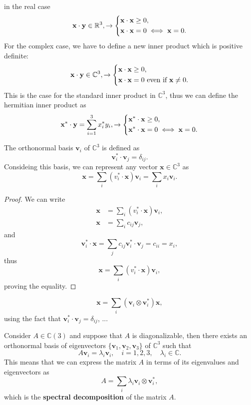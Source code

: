 in the real case
\[
    \mathbf{x} \cdot \mathbf{y} \in \mathbb{R}^3, \to  \begin{dcases}
        \mathbf{x} \cdot \mathbf{x} \geq 0, \\
        \mathbf{x} \cdot \mathbf{x} = 0 \iff \mathbf{x} = 0.
    \end{dcases}
\]
For the complex case, we have to define a new inner product which is positive definite:
\[
    \mathbf{x} \cdot \mathbf{y} \in \mathbb{C}^3, \to  \begin{dcases}
        \mathbf{x} \cdot \mathbf{x} \geq 0, \\
        \mathbf{x} \cdot \mathbf{x} = 0 \text{ even if } \mathbf{x} \neq 0.
    \end{dcases}
\]
This is the case for the standard inner product in \(\mathbb{C}^3\), thus we can define the hermitian inner product as
\[
    \mathbf{x}^* \cdot \mathbf{y} = \sum_{i=1}^3 x_i^* y_i, \to \begin{dcases}
        \mathbf{x}^* \cdot \mathbf{x} \geq 0, \\
        \mathbf{x}^* \cdot \mathbf{x} = 0 \iff \mathbf{x} = 0.
    \end{dcases}
\]

The orthonormal basis \(\mathbf{v}_i\) of \(\mathbb{C}^3\) is defined as
\[
    \mathbf{v}_i^* \cdot \mathbf{v}_j = \delta_{ij}.
\]
Consideing this basis, we can represent any vector \(\mathbf{x} \in \mathbb{C}^3\) as
\[
    \mathbf{x} = \sum_{i} (v_i^* \cdot \mathbf{x}) \mathbf{v}_i = \sum_{i} x_i \mathbf{v}_i.
\]
\begin{proof}
    We can write
    \[
        \begin{aligned}
            \mathbf{x} & = \sum_{i} (v_i^* \cdot \mathbf{x}) \mathbf{v}_i, \\
            \mathbf{x} & = \sum_{i} c_{ij} \mathbf{v}_j,
        \end{aligned}
    \]
    and
    \[
        \mathbf{v}_i^* \cdot \mathbf{x} = \sum_{j} c_{ij} \mathbf{v}_i^* \cdot \mathbf{v}_j = c_{ii} = x_i,
    \]
    thus
    \[
        \mathbf{x} = \sum_{i} (v_i^* \cdot \mathbf{x}) \mathbf{v}_i,
    \]
    proving the equality.

\end{proof}

\[
    \mathbf{x} = \sum_{i} (\mathbf{v}_i \otimes \mathbf{v}_i^*) \mathbf{x},
\]
using the fact that \(\mathbf{v}_i^* \cdot \mathbf{v}_j = \delta_{ij}\), ...




Consider \(A \in \mathbb{C}(3)\) and suppose that \(A\) is diagonalizable, then there exists an orthonormal basis of eigenvectors \(\{\mathbf{v}_1, \mathbf{v}_2, \mathbf{v}_3\}\) of \(\mathbb{C}^3\) such that
\[
    A \mathbf{v}_i = \lambda_i \mathbf{v}_i, \quad i = 1, 2, 3, \quad \lambda_i \in \mathbb{C}.
\]
This means that we can express the matrix \(A\) in terms of its eigenvalues and eigenvectors as
\[
    A = \sum_{i} \lambda_i \mathbf{v}_i \otimes \mathbf{v}_i^*,
\]
which is the \textbf{spectral decomposition} of the matrix \(A\).

